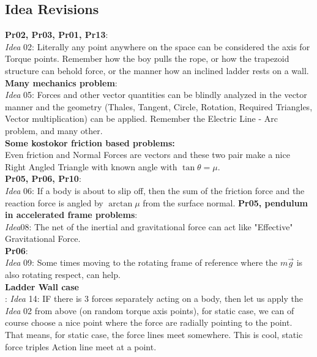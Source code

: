 \documentclass[a4paper]{article}
\theoremstyle{definition}
\begin{document}
\subsection{\textsf{Idea Revisions}}
\textsf{\textbf{Pr02, Pr03, Pr01, Pr13}}:\\
 \emph{Idea} 02: Literally any point anywhere on the space can be considered the axis for Torque points. Remember how the boy pulls the rope, or how the trapezoid structure can behold force, or the manner how an inclined ladder rests on a wall. \\
\textsf{\textbf{Many mechanics problem}}:\\
 \emph{Idea} 05: Forces and other vector quantities can be blindly analyzed in the vector manner and the geometry (Thales, Tangent, Circle, Rotation, Required Triangles, Vector multiplication) can be applied. Remember the Electric Line - Arc problem, and many other. \\
\textsf{\textbf{Some kostokor friction based problems:}}\\ Even friction and Normal Forces are vectors and these two pair make a nice Right Angled Triangle with known angle with $\tan \theta = \mu$. \\
\textsf{\textbf{Pr05, Pr06, Pr10}}:\\
 \emph{Idea} 06: If a body is about to slip off, then the sum of the friction force and the reaction force is angled by $\arctan \mu$ from the surface normal.
\textsf{\textbf{Pr05, pendulum in accelerated frame problems}}:\\
 \emph{Idea}08: The net of the inertial and gravitational force can act like "Effective" Gravitational Force. \\
\textsf{\textbf{Pr06}}:\\
 \emph{Idea} 09: Some times moving to the rotating frame of reference where the $m \vec{g}$ is also rotating respect, can help. \\
\textsf{\textbf{Ladder Wall case} }\\
: \emph{Idea} 14: IF there is $3$ forces separately acting on a body, then let us apply the \emph{Idea} 02 from above (on random torque axis points), for static case, we can of course choose a nice point where the force are radially pointing to the point. That means, for static case, the force lines meet somewhere. This is cool, static force triples Action line meet at a point. 
\end{document}
